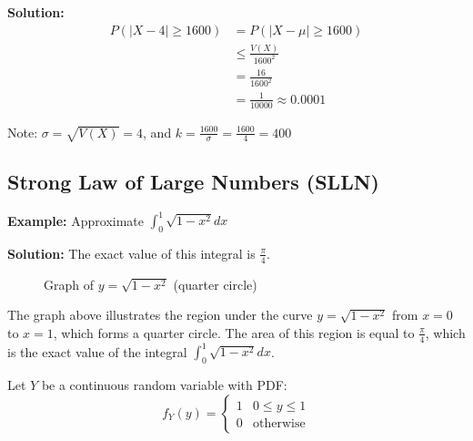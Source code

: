 \documentclass{article}
\begin{document}
    \noindent
    \textbf{Solution:}
    \begin{align*}
        P(|X-4| \geq 1600) &= P(|X-\mu| \geq 1600) \\
                        &\leq \frac{V(X)}{1600^2} \\
                        &= \frac{16}{1600^2} \\
                        &= \frac{1}{10000} \approx 0.0001
    \end{align*}

    Note: $\sigma = \sqrt{V(X)} = 4$, and $k = \frac{1600}{\sigma} = \frac{1600}{4} = 400$

    \subsection*{Strong Law of Large Numbers (SLLN)}

    \noindent
    \textbf{Example:} Approximate $\int_{0}^{1} \sqrt{1-x^2} dx$

    \noindent
    \textbf{Solution:} The exact value of this integral is $\frac{\pi}{4}$.

    \begin{figure}[h]
        \centering
        \caption{Graph of $y = \sqrt{1-x^2}$ (quarter circle)}
        \label{fig:quarter_circle}
    \end{figure}

    The graph above illustrates the region under the curve $y = \sqrt{1-x^2}$ from $x=0$ to $x=1$, which forms a quarter circle. The area of this region is equal to $\frac{\pi}{4}$, which is the exact value of the integral $\int_{0}^{1} \sqrt{1-x^2} dx$.

    Let $Y$ be a continuous random variable with PDF:
    \[
    f_Y(y) = 
    \begin{cases} 
        1 & 0 \leq y \leq 1 \\
        0 & \text{otherwise}
    \end{cases}
    \]
\end{document}
